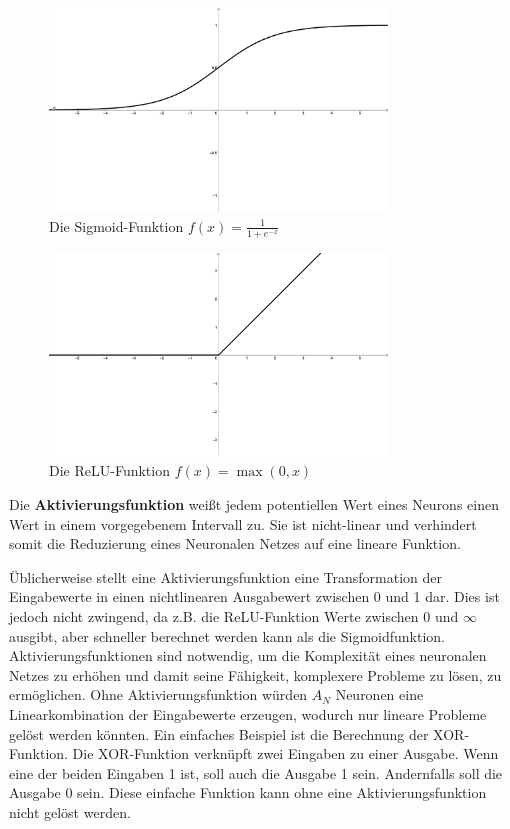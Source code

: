 \begin{figure}
    \centering
    \includegraphics[width=0.8\textwidth]{zeichnungen/sigmoid_black.pdf}
    \caption[Die Sigmoid-Funktion]{Die Sigmoid-Funktion $f(x) = \frac{1}{1+e^{-x}}$}\label{img:sigmoid}
\end{figure}

\begin{figure}
    \centering
    \includegraphics[width=0.8\textwidth]{zeichnungen/relu_black.pdf}
    \caption[Die ReLU-Funktion]{Die ReLU-Funktion $f(x) = \max(0,x)$}\label{img:relu}
\end{figure}

\begin{definition}\label{def:aktivierungsfunktion}
    Die \textbf{Aktivierungsfunktion} weißt jedem potentiellen Wert eines Neurons einen Wert in einem vorgegebenem Intervall zu.
    Sie ist nicht-linear und verhindert somit die Reduzierung eines Neuronalen Netzes auf eine lineare Funktion.
\end{definition}

Üblicherweise stellt eine Aktivierungsfunktion eine Transformation der Eingabewerte in einen nichtlinearen Ausgabewert zwischen 0 und 1 dar.
Dies ist jedoch nicht zwingend, da z.B. die ReLU-Funktion Werte zwischen 0 und $\infty$ ausgibt, aber schneller berechnet werden kann als die Sigmoidfunktion.
Aktivierungsfunktionen sind notwendig, um die Komplexität eines neuronalen Netzes zu erhöhen und damit seine Fähigkeit, komplexere Probleme zu lösen, zu ermöglichen.
Ohne Aktivierungsfunktion würden $A_N$ Neuronen eine Linearkombination der Eingabewerte erzeugen, wodurch nur lineare Probleme gelöst werden könnten.
Ein einfaches Beispiel ist die Berechnung der XOR-Funktion.
Die XOR-Funktion verknüpft zwei Eingaben zu einer Ausgabe. Wenn eine der beiden Eingaben 1 ist, soll auch die Ausgabe 1 sein.
Andernfalls soll die Ausgabe 0 sein.
Diese einfache Funktion kann ohne eine Aktivierungsfunktion nicht gelöst werden.\\

